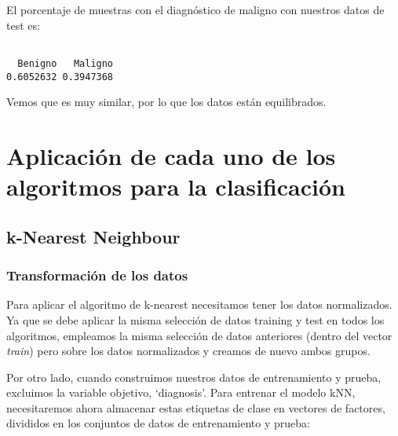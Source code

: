 \documentclass[
]{article}
\newenvironment{Shaded}{\begin{snugshade}}{\end{snugshade}}
\newcommand{\KeywordTok}[1]{\textcolor[rgb]{0.13,0.29,0.53}{\textbf{#1}}}
\newcommand{\NormalTok}[1]{#1}
\newcommand{\OperatorTok}[1]{\textcolor[rgb]{0.81,0.36,0.00}{\textbf{#1}}}
\begin{document}
El porcentaje de muestras con el diagnóstico de maligno con nuestros
datos de test es:

\begin{Shaded}
\end{Shaded}

\begin{verbatim}

  Benigno   Maligno 
0.6052632 0.3947368 
\end{verbatim}

Vemos que es muy similar, por lo que los datos están equilibrados.

\hypertarget{aplicaciuxf3n-de-cada-uno-de-los-algoritmos-para-la-clasificaciuxf3n}{%
\section{Aplicación de cada uno de los algoritmos para la
clasificación}\label{aplicaciuxf3n-de-cada-uno-de-los-algoritmos-para-la-clasificaciuxf3n}}

\hypertarget{k-nearest-neighbour}{%
\subsection{k-Nearest Neighbour}\label{k-nearest-neighbour}}

\hypertarget{transformaciuxf3n-de-los-datos}{%
\subsubsection{Transformación de los
datos}\label{transformaciuxf3n-de-los-datos}}

Para aplicar el algoritmo de k-nearest necesitamos tener los datos
normalizados. Ya que se debe aplicar la misma selección de datos
training y test en todos los algoritmos, empleamos la misma selección de
datos anteriores (dentro del vector \emph{train}) pero sobre los datos
normalizados y creamos de nuevo ambos grupos.

Por otro lado, cuando construimos nuestros datos de entrenamiento y
prueba, excluimos la variable objetivo, `diagnosis'. Para entrenar el
modelo kNN, necesitaremos ahora almacenar estas etiquetas de clase en
vectores de factores, divididos en los conjuntos de datos de
entrenamiento y prueba:
\end{document}
